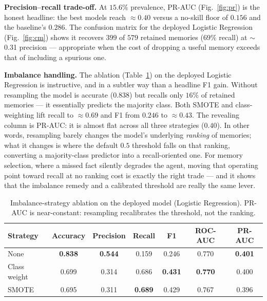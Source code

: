 \documentclass[11pt]{article}
\begin{document}
\textbf{Precision--recall trade-off.} At $15.6\%$ prevalence, PR-AUC
(Fig.~\ref{fig:pr}) is the honest headline: the best models reach $\approx0.40$
versus a no-skill floor of $0.156$ and the baseline's $0.286$. The confusion
matrix for the deployed Logistic Regression (Fig.~\ref{fig:cm}) shows it recovers
$399$ of $579$ retained memories ($69\%$ recall) at $\sim$0.31 precision ---
appropriate when the cost of dropping a useful memory exceeds that of including a
spurious one.

\textbf{Imbalance handling.} The ablation (Table~\ref{tab:abl}) on the deployed
Logistic Regression is instructive, and in a subtler way than a headline F1 gain.
Without resampling the model is accurate ($0.838$) but recalls only $16\%$ of
retained memories --- it essentially predicts the majority class. Both SMOTE and
class-weighting lift recall to $\approx0.69$ and F1 from $0.246$ to $\approx0.43$.
The revealing column is PR-AUC: it is almost flat across all three strategies
($0.40$). In other words, resampling barely changes the model's underlying
\emph{ranking} of memories; what it changes is where the default $0.5$ threshold
falls on that ranking, converting a majority-class predictor into a
recall-oriented one. For memory selection, where a missed fact silently degrades
the agent, moving that operating point toward recall at no ranking cost is exactly
the right trade --- and it shows that the imbalance remedy and a calibrated
threshold are really the same lever.

\begin{table}[t]
\centering\small
\caption{Imbalance-strategy ablation on the deployed model (Logistic Regression).
PR-AUC is near-constant: resampling recalibrates the threshold, not the ranking.}
\label{tab:abl}
\begin{tabular}{lcccccc}
\toprule
Strategy & Accuracy & Precision & Recall & F1 & ROC-AUC & PR-AUC \\
\midrule
None & \textbf{0.838} & \textbf{0.544} & 0.159 & 0.246 & 0.770 & \textbf{0.401} \\
Class weight & 0.699 & 0.314 & 0.686 & \textbf{0.431} & \textbf{0.770} & 0.400 \\
SMOTE & 0.695 & 0.311 & \textbf{0.689} & 0.429 & 0.767 & 0.396 \\
\bottomrule
\end{tabular}
\end{table}
\end{document}
